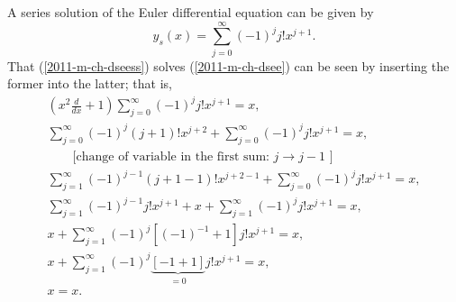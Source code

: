 A series solution of the Euler differential equation can be given by
\begin{equation}
{y_s} (x) = \sum_{j=0}^\infty (-1)^j j! x^{j+1}.
\label{2011-m-ch-dseess}
\end{equation}
That (\ref{2011-m-ch-dseess})
solves  (\ref{2011-m-ch-dsee})
can be seen by inserting the former into the latter; that is,
\begin{equation}
\begin{split}
\left(x^2 \frac{d}{dx} +1\right) \sum_{j=0}^\infty (-1)^j j! x^{j+1} = {x},  \\
\sum_{j=0}^\infty (-1)^j (j+1)! x^{j+2} + \sum_{j=0}^\infty (-1)^j j! x^{j+1} = {x},  \\
\qquad \textrm{[change of variable in the first sum: } j \rightarrow j-1\textrm{ ]}\\
\sum_{j=1}^\infty (-1)^{j-1} (j+1-1)! x^{j+2-1} + \sum_{j=0}^\infty (-1)^j j! x^{j+1} = {x},  \\
\sum_{j=1}^\infty (-1)^{j-1} j! x^{j+1} + x +\sum_{j=1}^\infty (-1)^j j! x^{j+1} = {x},  \\
x +\sum_{j=1}^\infty (-1)^j\left[(-1)^{-1} +1\right] j! x^{j+1}    = {x},  \\
x +\sum_{j=1}^\infty (-1)^j \underbrace{\left[ -1  +1\right]}_{=0} j! x^{j+1}    = {x},  \\
x    = {x}.  \\
\end{split}
\label{2011-m-ch-dsee111}
\end{equation}


